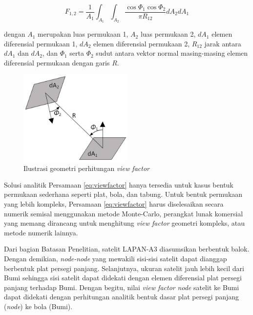 \begin{equation}
\label{eq:viewfactor}
	F_{1,2} = \frac{1}{A_1} \int_{A_1} \int_{A_2} \frac{\cos{\Phi_1} \cos{\Phi_2}}{\pi R_{12}} dA_2 dA_1
\end{equation}

dengan $A_1$ merupakan luas permukaan 1, $A_2$ luas permukaan 2, $dA_1$ elemen
diferensial permukaan 1, $dA_2$ elemen diferensial permukaan 2, $R_{12}$ jarak
antara $dA_1$ dan $dA_2$, dan $\Phi_1$ serta $\Phi_2$ sudut antara vektor
normal masing-masing elemen diferensial permukaan dengan garis $R$.  

\begin{figure}[!ht]
\setlength{}
\begin{center}
\includegraphics[width=0.5\textwidth]{fig/viewfactor.jpg}
	\caption{Ilustrasi geometri perhitungan \textit{view factor}}
\label{fig:viewfactor}
\end{center}
\end{figure}

Solusi analitik Persamaan \ref{eq:viewfactor} hanya tersedia
untuk kasus bentuk permukaan sederhana seperti plat, bola, dan tabung.
Untuk bentuk permukaan yang lebih kompleks, Persamaan
\ref{eq:viewfactor} harus diselesaikan secara numerik semisal
menggunakan metode Monte-Carlo, perangkat lunak komersial yang memang
dirancang untuk menghitung \textit{view factor} geometri kompleks,
atau metode numerik lainnya.

Dari bagian Batasan Penelitian, satelit LAPAN-A3 diasumsikan berbentuk
balok. Dengan demikian, \textit{node-node} yang mewakili sisi-sisi
satelit dapat dianggap berbentuk plat persegi panjang. Selanjutnya, ukuran
satelit jauh lebih kecil dari Bumi sehingga sisi satelit dapat didekati dengan
elemen diferensial plat persegi panjang terhadap Bumi. Dengan begitu, nilai
\textit{view factor} \textit{node} satelit ke Bumi dapat didekati
dengan perhitungan analitik bentuk dasar plat persegi panjang
(\textit{node}) ke bola (Bumi). 

